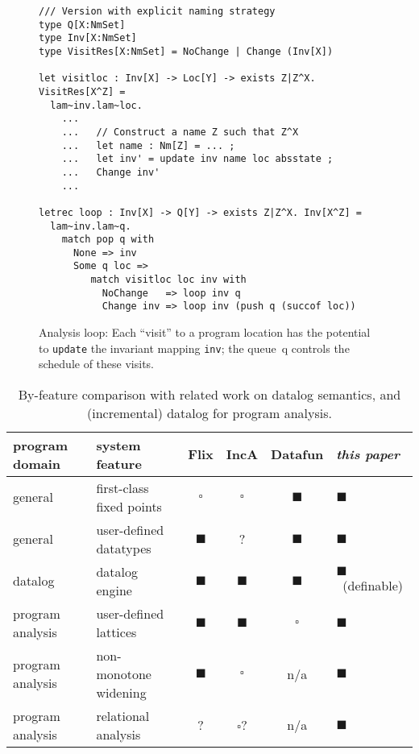 \documentclass[acmlarge,anonymous]{acmart}\settopmatter{printfolios=true}
\newcommand{\code}[1]{\lstinline[basicstyle=\ttfamily]|#1|}
\begin{document}
\begin{figure}
\begin{lstlisting}
/// Version with explicit naming strategy
type Q[X:NmSet]
type Inv[X:NmSet]
type VisitRes[X:NmSet] = NoChange | Change (Inv[X])

let visitloc : Inv[X] -> Loc[Y] -> exists Z|Z^X. VisitRes[X^Z] =
  lam~inv.lam~loc.
    ...
    ...   // Construct a name Z such that Z^X
    ...   let name : Nm[Z] = ... ;
    ...   let inv' = update inv name loc absstate ;
    ...   Change inv'
    ...

letrec loop : Inv[X] -> Q[Y] -> exists Z|Z^X. Inv[X^Z] =
  lam~inv.lam~q.
    match pop q with
      None => inv
      Some q loc =>
         match visitloc loc inv with
           NoChange   => loop inv q
           Change inv => loop inv (push q (succof loc))
\end{lstlisting}
\caption{Analysis loop: Each ``visit'' to a program location has the
  potential to \code{update} the invariant mapping \code{inv}; the
  queue~{q} controls the schedule of these visits. }
\end{figure}

\newcommand{\TabYes}{\ensuremath{\blacksquare}}
\newcommand{\TabNo}{\ensuremath{\square}}

\begin{table}
\begin{tabular}{|p{1.3in}p{1.5in}||ccc|l|}
  \hline
  \textbf{program domain} &
  \textbf{system feature} & Flix & IncA & Datafun & \emph{this paper}
  \\
  \hline
  general &
  first-class  
  fixed points & \TabNo & \TabNo & \TabYes & \TabYes
  \\
  general &
  user-defined
  datatypes & \TabYes & ? & \TabYes & \TabYes
  \\
  \hline
  datalog &
  datalog engine & \TabYes & \TabYes & \TabYes & \TabYes~(definable)
  \\
  \hline
  program analysis &
  user-defined lattices & \TabYes & \TabYes & \TabNo & \TabYes
  \\
  program analysis &
  non-monotone 
  widening
  & \TabYes & \TabNo & n/a & \TabYes
  \\
  program analysis &
  relational 
  analysis
  & ? & \TabNo? & n/a & \TabYes
  \\
  \hline
\end{tabular}
\caption{By-feature comparison with related work on datalog semantics, and (incremental) datalog for program analysis.}
\label{tab:relatedwork}
\end{table}
\end{document}
